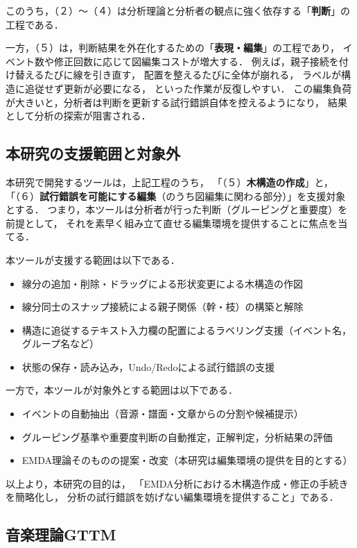 このうち，（２）〜（４）は分析理論と分析者の観点に強く依存する「\textbf{判断}」の工程である．

一方，（５）は，判断結果を外在化するための「\textbf{表現・編集}」の工程であり，
イベント数や修正回数に応じて図編集コストが増大する．
%
例えば，親子接続を付け替えるたびに線を引き直す，
配置を整えるたびに全体が崩れる，
ラベルが構造に追従せず更新が必要になる，
といった作業が反復しやすい．
%
この編集負荷が大きいと，分析者は判断を更新する試行錯誤自体を控えるようになり，
結果として分析の探索が阻害される．


\subsection{本研究の支援範囲と対象外}

本研究で開発するツールは，上記工程のうち，
「（５）\textbf{木構造の作成}」と，
「（６）\textbf{試行錯誤を可能にする編集}（のうち図編集に関わる部分）」を支援対象とする．
%
つまり，本ツールは分析者が行った判断（グルーピングと重要度）を前提として，
それを素早く組み立て直せる編集環境を提供することに焦点を当てる．

本ツールが支援する範囲は以下である．
\begin{itemize}
  \item 線分の追加・削除・ドラッグによる形状変更による木構造の作図
  \item 線分同士のスナップ接続による親子関係（幹・枝）の構築と解除
  \item 構造に追従するテキスト入力欄の配置によるラベリング支援（イベント名，グループ名など）
  \item 状態の保存・読み込み，Undo/Redoによる試行錯誤の支援
\end{itemize}

一方で，本ツールが対象外とする範囲は以下である．
\begin{itemize}
  \item イベントの自動抽出（音源・譜面・文章からの分割や候補提示）
  \item グルーピング基準や重要度判断の自動推定，正解判定，分析結果の評価
  \item EMDA理論そのものの提案・改変（本研究は編集環境の提供を目的とする）
\end{itemize}

以上より，本研究の目的は，
「EMDA分析における木構造作成・修正の手続きを簡略化し，
分析の試行錯誤を妨げない編集環境を提供すること」である．


\subsection{音楽理論GTTM}

